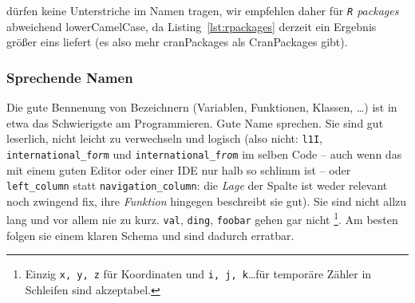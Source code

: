 \documentclass[twoside]{scrartcl}
\providecommand{\R}{\texttt{R}}
\providecommand{\code}[1]{\texttt{#1}}
\begin{document}
 d\"urfen keine Unterstriche im Namen 
tragen, wir
empfehlen daher f\"u{}r \emph{\R{} packages} abweichend lowerCamelCase, 
da Listing~\ref{lst:rpackages} derzeit ein Ergebnis gr\"o{}\ss{}er eins 
liefert (es also mehr cranPackages als CranPackages gibt).


\subsubsection{Sprechende Namen}
Die gute Bennenung von Bezeichnern (Variablen, Funktionen, Klassen, \ldots)
ist in etwa
das Schwierigste am Programmieren. Gute Name sprechen. Sie sind gut leserlich,
nicht leicht zu verwechseln und logisch (also nicht: \code{l1I},
\code{international\_f\emph{or}m} und \code{international\_f\emph{ro}m} im 
selben Code -- auch wenn das mit einem guten Editor oder einer IDE nur halb so 
schlimm ist -- oder \code{left\_column} statt \code{navigation\_column}: die 
\emph{Lage} der Spalte ist weder relevant noch zwingend fix, ihre 
\emph{Funktion} hingegen beschreibt sie gut).
Sie sind nicht allzu lang und vor allem nie zu kurz.
\code{val}, \code{ding}, \code{foobar} gehen gar nicht%
\footnote{Einzig \code{x, y, z} f\"ur Koordinaten
  und \code{i, j, k}\ldots f\"ur tempor\"a{}re Z\"a{}hler in Schleifen sind
  akzeptabel.}.
Am besten folgen sie einem klaren Schema und sind dadurch erratbar.
\end{document}
